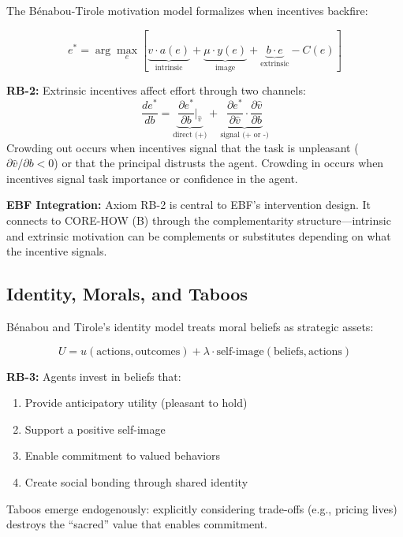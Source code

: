 The Bénabou-Tirole motivation model \citep{benabou_tirole_2003_intrinsic} formalizes when incentives backfire:

\begin{equation}
e^* = \arg\max_e \left[ \underbrace{v \cdot a(e)}_{\text{intrinsic}} + \underbrace{\mu \cdot y(e)}_{\text{image}} + \underbrace{b \cdot e}_{\text{extrinsic}} - C(e) \right]
\label{eq:rb-motivation}
\end{equation}

\begin{axiom}
\label{ax:rb-2}
\textbf{RB-2:} Extrinsic incentives affect effort through two channels:
\begin{equation}
\frac{de^*}{db} = \underbrace{\frac{\partial e^*}{\partial b}\bigg|_{\hat{v}}}_{\text{direct (+)}} + \underbrace{\frac{\partial e^*}{\partial \hat{v}} \cdot \frac{\partial \hat{v}}{\partial b}}_{\text{signal (+ or -)}}
\end{equation}
Crowding out occurs when incentives signal that the task is unpleasant ($\partial \hat{v}/\partial b < 0$) or that the principal distrusts the agent. Crowding in occurs when incentives signal task importance or confidence in the agent.
\end{axiom}

\textbf{EBF Integration:} Axiom RB-2 is central to EBF's intervention design. It connects to CORE-HOW (B) through the complementarity structure---intrinsic and extrinsic motivation can be complements or substitutes depending on what the incentive signals.

\subsection{Identity, Morals, and Taboos}
\label{subsec:rb-identity}

Bénabou and Tirole's identity model \citep{benabou_tirole_2011_identity} treats moral beliefs as strategic assets:

\begin{equation}
U = u(\text{actions}, \text{outcomes}) + \lambda \cdot \text{self-image}(\text{beliefs}, \text{actions})
\label{eq:rb-identity}
\end{equation}

\begin{axiom}
\label{ax:rb-3}
\textbf{RB-3:} Agents invest in beliefs that:
\begin{enumerate}
    \item Provide anticipatory utility (pleasant to hold)
    \item Support a positive self-image
    \item Enable commitment to valued behaviors
    \item Create social bonding through shared identity
\end{enumerate}
Taboos emerge endogenously: explicitly considering trade-offs (e.g., pricing lives) destroys the ``sacred'' value that enables commitment.
\end{axiom}

